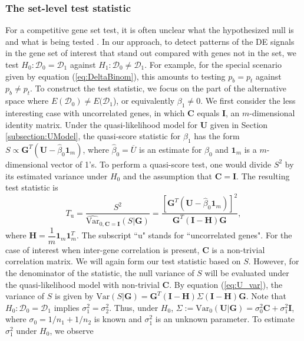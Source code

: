\documentclass[a4,center,fleqn]{NAR}
\begin{document}
	\subsubsection{The set-level test statistic}\label{subsection:MEQL}
	For a competitive gene set test, it is often unclear what the hypothesized null is and what is
	being tested \citep{barry2008statistical,wu2012camera}. In our approach, to detect patterns of the
	DE signals in the gene set of interest that stand out compared with genes not in the set, we test
	$H_0: \mathscr{D}_0=\mathscr{D}_1$ against $H_1: \mathscr{D}_0\ne\mathscr{D}_1$. For example, for
	the special scenario given by equation (\ref{eq:DeltaBinom}), this amounts to testing 
	$p_{b}=p_{t}$
	against $p_{b}\ne p_{t}$.
	To construct the test statistic, we focus on the part of the alternative space where
	$E(\mathscr{D}_0)\ne E(\mathscr{D}_1$), or equivalently $\beta_1\ne 0$. We first consider the less
	interesting case with uncorrelated genes, in which $\bm C$ equals $\bm I$, an $m$-dimensional
	identity matrix. Under the quasi-likelihood model for $\bm U$ given in Section
	\ref{subsection:UModel},  the quasi-score statistic for $\beta_1$ has the form $S \propto \bm
	G^T(\bm U-\hat\beta_0\bm 1_m)$, where $\hat\beta_0=\overline{U}$ is an estimate for $\beta_0$ and
	$\bm 1_m$ is a $m$-dimensional vector of 1's. To perform a quasi-score test, one would divide $S^2$
	by its estimated variance under $H_0$ and the assumption that $\bm C=\bm I$. The resulting test
	statistic is 
	\begin{equation}
	T_{\text{u}} = \dfrac{S^2}{\widehat{\mbox{Var}}_{0, \bm C=\bm I}(S|\bm G)} = \dfrac{[\bm G^T(\bm
		U-\hat\beta_0\bm 1_m)]^2}{\bm G^T(\bm I-\bm H)\bm G}, 
	\end{equation}
	where $\bm H = \dfrac{1}{m}\bm 1_m\bm 1_m^T$. The subscript ``u" stands for ``uncorrelated genes".
	For the case of interest when inter-gene correlation is present, $\bm C$ is a non-trivial
	correlation matrix. We will again form our test statistic based on $S$. However, for the
	denominator of the statistic, the null variance of $S$ will be evaluated under the quasi-likelihood
	model with non-trivial $\bm C$. By equation (\ref{eq:U_var}), the variance of $S$ is given by
	$\mbox{Var}(S|\bm G) = \bm G^T(\bm I-\bm H)\Sigma(\bm I-\bm H)\bm G$. Note that $H_0:
	\mathscr{D}_0=\mathscr{D}_1$ implies $\sigma_1^2=\sigma_2^2$. Thus, under $H_0$,
	$\Sigma:=\mbox{Var}_{0}(\bm U|\bm G)=\sigma_0^2\bm C+\sigma_1^2\bm I$, where $\sigma_0=1/n_1+1/n_2$
	is known and $\sigma_1^2$ is an unknown parameter. To estimate $\sigma_1^2$ under $H_0$, we observe
\end{document}

